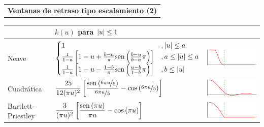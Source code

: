 \begin{SidewaysTable}
\centering
{}
\begin{tabular}{c}
\textbf{Ventanas de retraso tipo escalamiento (2)}
\vspace{1em}
\end{tabular}

{
\begin{tabular}{lll}
\toprule
& $k(u)$ para $\left| u \right| \leq 1$  & \\
\midrule
Neave &
$\displaystyle 
\begin{cases}
1 &, \left| u \right|\leq a \\
\frac{1}{1-a}\left[ 1-u +\frac{b-a}{\pi}\mathrm{sen}\left( \frac{b-u}{b-a}\pi \right) \right] &, a \leq \left| u \right|\leq a \\
\frac{1}{1-a}\left[ 1-u -\frac{1-b}{\pi}\mathrm{sen}\left( \frac{u-b}{1-b}\pi \right) \right] &, b \leq \left| u \right| \\
\end{cases}
$
& \includegraphics[scale=.66]{./img_ventanas/ventana_neave.pdf}
\\
\rowcolor{gris}
Cuadrática &
$\displaystyle 
\frac{25}{12(\pi u)^{2}} 
\left[ \frac{\mathrm{sen}\left( \nicefrac{6 \pi u}{5} \right)}{\nicefrac{6\pi u}{5}} - \mathrm{cos}\left( \nicefrac{6 \pi u}{5} \right) \right]
$
& \includegraphics[scale=.66]{./img_ventanas/ventana_cuadratica.pdf}
\\
Bartlett-Priestley &
$\displaystyle 
\frac{3}{(\pi u)^{2}} \left[ \frac{\mathrm{sen}\left( \pi u \right)}{\pi u} - \mathrm{cos}\left( \pi u \right) \right]
$
& \includegraphics[scale=.66]{./img_ventanas/ventana_cosenoidal.pdf}
\\

\end{tabular}}
\end{SidewaysTable}
